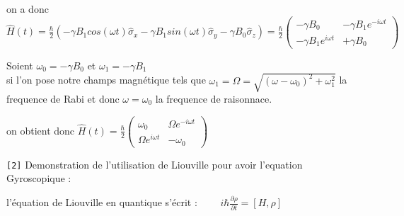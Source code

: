 \documentclass[11pt]{article}
\begin{document}
\begin{tabbing}
on a donc $\hat H(t) = \frac{\hbar}{2}(- \gamma B_1 cos(\omega t) \hat \sigma_x - \gamma B_1 sin(\omega t) \hat \sigma_y - \gamma B_0 \hat \sigma_z) = \frac{\hbar}{2} \begin{pmatrix}
- \gamma B_0  & - \gamma B_1 e^{-i\omega t} \\
- \gamma B_1 e^{i\omega t}  & + \gamma B_0 
\end{pmatrix}$
\end{tabbing}

Soient $\omega_0 = - \gamma B_0$ et $\omega_1 = - \gamma B_1$\\
si l'on pose notre champs magnétique tels que  $\omega_1 = \Omega = \sqrt{(\omega-\omega_0)^2+\omega_1^2}$ la frequence de Rabi et donc $\omega = \omega_0 $ la frequence de raisonnace.

\begin{tabbing}
    on obtient donc $\hat H(t) = \frac{\hbar}{2} \begin{pmatrix}
\omega_0  & \Omega e^{-i\omega t} \\
\Omega e^{i\omega t}  & - \omega_0 
\end{pmatrix}$
\end{tabbing}
\vspace{0.5cm}

{\texttt{[2]}} \label{sec:Liouville}Demonstration de l'utilisation de Liouville pour avoir l'equation Gyroscopique :
\begin{tabbing}
    l'équation de Liouville en quantique s'écrit : $\qquad i\hbar \frac{\partial \rho}{\partial t} = [H, \rho]$
\end{tabbing}
\end{document}
